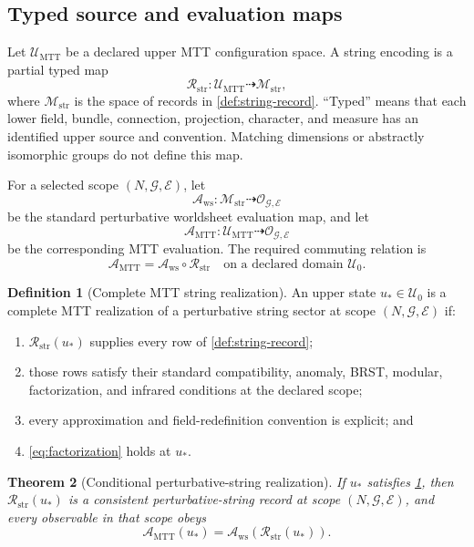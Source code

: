 \documentclass[11pt]{article}
\newtheorem{theorem}{Theorem}[section]
\theoremstyle{definition}
\newtheorem{definition}[theorem]{Definition}
\theoremstyle{remark}
\newcommand{\cA}{\mathcal A}
\newcommand{\cE}{\mathcal E}
\newcommand{\cG}{\mathcal G}
\newcommand{\cM}{\mathcal M}
\newcommand{\cO}{\mathcal O}
\newcommand{\cR}{\mathcal R}
\newcommand{\cU}{\mathcal U}
\begin{document}
\subsection{Typed source and evaluation maps}

Let \(\cU_{\mathrm{MTT}}\) be a declared upper MTT configuration space.  A
string encoding is a partial typed map
\[
\cR_{\mathrm{str}}:
\cU_{\mathrm{MTT}}\dashrightarrow\cM_{\mathrm{str}},
\]
where \(\cM_{\mathrm{str}}\) is the space of records in
\cref{def:string-record}.  ``Typed'' means that each lower field, bundle,
connection, projection, character, and measure has an identified upper
source and convention.  Matching dimensions or abstractly isomorphic groups
do not define this map.

For a selected scope \((N,\cG,\cE)\), let
\[
\cA_{\mathrm{ws}}:\cM_{\mathrm{str}}\dashrightarrow\cO_{\cG,\cE}
\]
be the standard perturbative worldsheet evaluation map, and let
\[
\cA_{\mathrm{MTT}}:\cU_{\mathrm{MTT}}\dashrightarrow\cO_{\cG,\cE}
\]
be the corresponding MTT evaluation.  The required commuting relation is
\[
\cA_{\mathrm{MTT}}
=\cA_{\mathrm{ws}}\circ\cR_{\mathrm{str}}
\quad\text{on a declared domain }\cU_0.
\label{eq:factorization}
\]

\begin{definition}[Complete MTT string realization]
\label{def:mtt-realization}
An upper state \(u_\ast\in\cU_0\) is a complete MTT realization of a
perturbative string sector at scope \((N,\cG,\cE)\) if:
\begin{enumerate}[leftmargin=1.7em]
\item \(\cR_{\mathrm{str}}(u_\ast)\) supplies every row of
      \cref{def:string-record};
\item those rows satisfy their standard compatibility, anomaly, BRST,
      modular, factorization, and infrared conditions at the declared scope;
\item every approximation and field-redefinition convention is explicit;
      and
\item \cref{eq:factorization} holds at \(u_\ast\).
\end{enumerate}
\end{definition}

\begin{theorem}[Conditional perturbative-string realization]
\label{thm:string-realization}
If \(u_\ast\) satisfies \cref{def:mtt-realization}, then
\(\cR_{\mathrm{str}}(u_\ast)\) is a consistent perturbative-string record at
scope \((N,\cG,\cE)\), and every observable in that scope obeys
\[
\cA_{\mathrm{MTT}}(u_\ast)
=\cA_{\mathrm{ws}}\!\left(\cR_{\mathrm{str}}(u_\ast)\right).
\]
\end{theorem}
\end{document}
